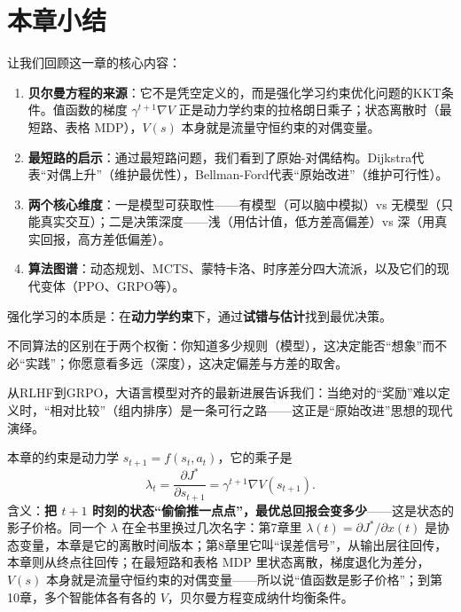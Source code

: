 \section{本章小结}

让我们回顾这一章的核心内容：

\begin{enumerate}
    \item \textbf{贝尔曼方程的来源}：它不是凭空定义的，而是强化学习约束优化问题的KKT条件。值函数的梯度 $\gamma^{t+1}\nabla V$ 正是动力学约束的拉格朗日乘子；状态离散时（最短路、表格 MDP），$V(s)$ 本身就是流量守恒约束的对偶变量。
    
    \item \textbf{最短路的启示}：通过最短路问题，我们看到了原始-对偶结构。Dijkstra代表“对偶上升”（维护最优性），Bellman-Ford代表“原始改进”（维护可行性）。
    
    \item \textbf{两个核心维度}：一是模型可获取性——有模型（可以脑中模拟）vs 无模型（只能真实交互）；二是决策深度——浅（用估计值，低方差高偏差）vs 深（用真实回报，高方差低偏差）。
    
    \item \textbf{算法图谱}：动态规划、MCTS、蒙特卡洛、时序差分四大流派，以及它们的现代变体（PPO、GRPO等）。
\end{enumerate}

\begin{physicalmeaning}
强化学习的本质是：在\textbf{动力学约束}下，通过\textbf{试错与估计}找到最优决策。

不同算法的区别在于两个权衡：你知道多少规则（模型），这决定能否“想象”而不必“实践”；你愿意看多远（深度），这决定偏差与方差的取舍。

从RLHF到GRPO，大语言模型对齐的最新进展告诉我们：当绝对的“奖励”难以定义时，“相对比较”（组内排序）是一条可行之路——这正是“原始改进”思想的现代演绎。
\end{physicalmeaning}

\begin{physicalmeaning}[title=$\lambda$ 在本章的意义]
本章的约束是动力学 $s_{t+1} = f(s_t, a_t)$，它的乘子是
\[
\lambda_t = \frac{\partial J^*}{\partial s_{t+1}} = \gamma^{t+1} \nabla V(s_{t+1}).
\]
含义：\textbf{把 $t+1$ 时刻的状态“偷偷推一点点”，最优总回报会变多少}——这是状态的影子价格。同一个 $\lambda$ 在全书里换过几次名字：第7章里 $\lambda(t) = \partial J^*/\partial x(t)$ 是协态变量，本章是它的离散时间版本；第8章里它叫“误差信号”，从输出层往回传，本章则从终点往回传；在最短路和表格 MDP 里状态离散，梯度退化为差分，$V(s)$ 本身就是流量守恒约束的对偶变量——所以说“值函数是影子价格”；到第10章，多个智能体各有各的 $V$，贝尔曼方程变成纳什均衡条件。
\end{physicalmeaning}

